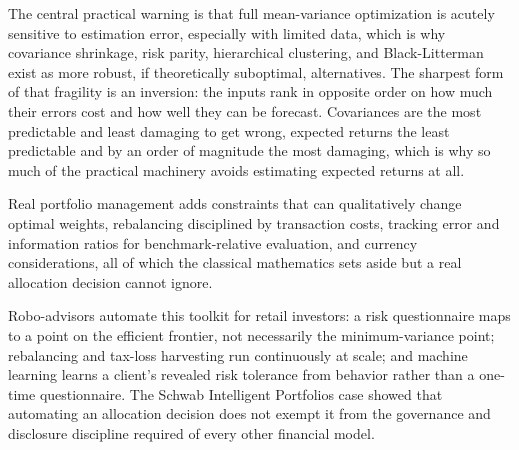 \documentclass[../ai_in_finance]{subfiles}
\begin{document}
The central practical warning is that full mean-variance optimization is acutely sensitive to estimation error, especially with limited data, which is why covariance shrinkage, risk parity, hierarchical clustering, and Black-Litterman exist as more robust, if theoretically suboptimal, alternatives. The sharpest form of that fragility is an inversion: the inputs rank in opposite order on how much their errors cost and how well they can be forecast. Covariances are the most predictable and least damaging to get wrong, expected returns the least predictable and by an order of magnitude the most damaging, which is why so much of the practical machinery avoids estimating expected returns at all.

Real portfolio management adds constraints that can qualitatively change optimal weights, rebalancing disciplined by transaction costs, tracking error and information ratios for benchmark-relative evaluation, and currency considerations, all of which the classical mathematics sets aside but a real allocation decision cannot ignore.

Robo-advisors automate this toolkit for retail investors: a risk questionnaire maps to a point on the efficient frontier, not necessarily the minimum-variance point; rebalancing and tax-loss harvesting run continuously at scale; and machine learning learns a client's revealed risk tolerance from behavior rather than a one-time questionnaire. The Schwab Intelligent Portfolios case showed that automating an allocation decision does not exempt it from the governance and disclosure discipline required of every other financial model.

\end{document}
